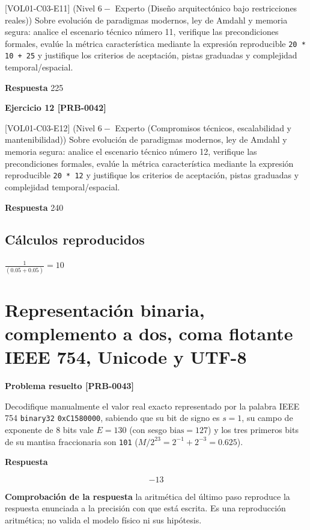 \documentclass{book}
\begin{document}
[VOL01-C03-E11] (Nivel \(6 -\) Experto (Diseño arquitectónico bajo restricciones reales)) Sobre evolución de paradigmas modernos, ley de Amdahl y memoria segura: analice el escenario técnico número 11, verifique las precondiciones formales, evalúe la métrica característica mediante la expresión reproducible \texttt{20 * 10 + 25} y justifique los criterios de aceptación, pistas graduadas y complejidad temporal/espacial.

\noindent\textbf{Respuesta} 225

\noindent\textbf{Ejercicio 12 [PRB-0042]}

[VOL01-C03-E12] (Nivel \(6 -\) Experto (Compromisos técnicos, escalabilidad y mantenibilidad)) Sobre evolución de paradigmas modernos, ley de Amdahl y memoria segura: analice el escenario técnico número 12, verifique las precondiciones formales, evalúe la métrica característica mediante la expresión reproducible \texttt{20 * 12} y justifique los criterios de aceptación, pistas graduadas y complejidad temporal/espacial.

\noindent\textbf{Respuesta} 240

\subsection*{Cálculos reproducidos}

\(\frac{1}{\left(0.05+0.05\right)} = 10\)

\section{Representación binaria, complemento a dos, coma flotante IEEE 754, Unicode y UTF-8}

\noindent\textbf{Problema resuelto [PRB-0043]}

Decodifique manualmente el valor real exacto representado por la palabra IEEE 754 \texttt{binary32} \texttt{0xC1580000}, sabiendo que su bit de signo es \(s = 1\), su campo de exponente de 8 bits vale \(E = 130\) (con sesgo \(\text{bias} = 127\)) y los tres primeros bits de su mantisa fraccionaria son \texttt{101} (\(M / 2^{23} = 2^{-1} + 2^{-3} = 0.625\)).

\noindent\textbf{Respuesta}

\[
-13
\]

\noindent\textbf{Comprobación de la respuesta} la aritmética del último paso reproduce la respuesta enunciada a la precisión con que está escrita. Es una reproducción aritmética; no valida el modelo físico ni sus hipótesis.
\end{document}
